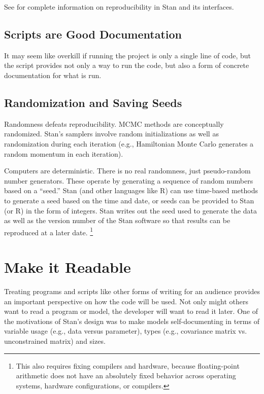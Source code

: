 See  for complete information on
reproducibility in Stan and its interfaces.

\subsection{Scripts are Good Documentation}

It may seem like overkill if running the project is only a single line
of code, but the script provides not only a way to run the code, but
also a form of concrete documentation for what is run. 


\subsection{Randomization and Saving Seeds}

Randomness defeats reproducibility.  MCMC methods are conceptually
randomized.  Stan's samplers involve random initializations as well as
randomization during each iteration (e.g., Hamiltonian Monte Carlo
generates a random momentum in each iteration).

Computers are deterministic.  There is no real randomness, just
pseudo-random number generators.  These operate by generating a
sequence of random numbers based on a ``seed.''  Stan (and other
languages like R) can use time-based methods to generate a seed based
on the time and date, or seeds can be provided to Stan (or R) in the
form of integers.  Stan writes out the seed used to generate the
data as well as the version number of the Stan software so that
results can be reproduced at a later date.%
%
\footnote{This also requires fixing compilers and hardware, because
  floating-point arithmetic does not have an absolutely fixed behavior
  across operating systems, hardware configurations, or compilers.}



\section{Make it Readable}

Treating programs and scripts like other forms of writing for an
audience provides an important perspective on how the code will be
used.  Not only might others want to read a program or model, the
developer will want to read it later.  One of the motivations of
Stan's design was to make models self-documenting in terms of variable
usage (e.g., data versus parameter), types (e.g., covariance matrix
vs. unconstrained matrix) and sizes.  

